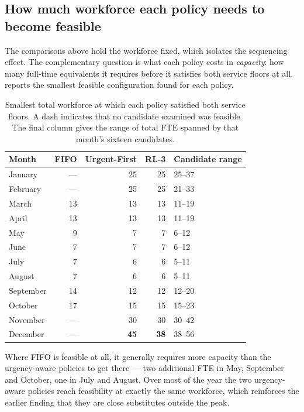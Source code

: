 \subsection{How much workforce each policy needs to become feasible}
\label{sec:res-min-feasible}

The comparisons above hold the workforce fixed, which isolates the sequencing effect. The
complementary question is what each policy costs in \emph{capacity}: how many full-time
equivalents it requires before it satisfies both service floors at all.
 reports the smallest feasible configuration found for each policy.

\begin{table}[htbp]
\centering
\caption[Smallest feasible workforce by policy]{Smallest total workforce at which each policy
satisfied both service floors. A dash indicates that no candidate examined was feasible. The
final column gives the range of total FTE spanned by that month's sixteen candidates.}
\label{tab:min-feasible}
\small
\begin{tabular}{lrrrl}
\toprule
\textbf{Month} & \textbf{FIFO} & \textbf{Urgent-First} & \textbf{RL-3} &
\textbf{Candidate range} \\
\midrule
January   & --- & 25 & 25 & 25--37 \\
February  & --- & 25 & 25 & 21--33 \\
March     & 13 & 13 & 13 & 11--19 \\
April     & 13 & 13 & 13 & 11--19 \\
May       &  9 &  7 &  7 & 6--12 \\
June      &  7 &  7 &  7 & 6--12 \\
July      &  7 &  6 &  6 & 5--11 \\
August    &  7 &  6 &  6 & 5--11 \\
September & 14 & 12 & 12 & 12--20 \\
October   & 17 & 15 & 15 & 15--23 \\
November  & --- & 30 & 30 & 30--42 \\
December  & --- & \textbf{45} & \textbf{38} & 38--56 \\
\bottomrule
\end{tabular}
\end{table}

Where FIFO is feasible at all, it generally requires more capacity than the urgency-aware
policies to get there --- two additional FTE in May, September and October, one in July and
August. Over most of the year the two urgency-aware policies reach feasibility at exactly the
same workforce, which reinforces the earlier finding that they are close substitutes outside the
peak.

